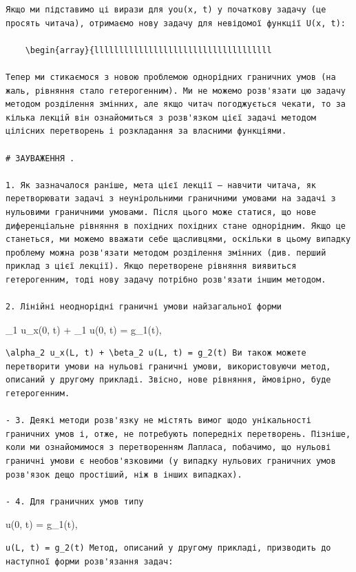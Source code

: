 \documentclass[
  ukrainian,
]{article}
\begin{document}
\begin{verbatim}
Якщо ми підставимо ці вирази для you(x, t) у початкову задачу (це просять читача), отримаємо нову задачу для невідомої функції U(x, t):

    \begin{array}{llllllllllllllllllllllllllllllllllll

Тепер ми стикаємося з новою проблемою однорідних граничних умов (на жаль, рівняння стало гетерогенним). Ми не можемо розв'язати цю задачу методом розділення змінних, але якщо читач погоджується чекати, то за кілька лекцій він ознайомиться з розв'язком цієї задачі методом цілісних перетворень і розкладання за власними функціями.

# ЗАУВАЖЕННЯ .

1. Як зазначалося раніше, мета цієї лекції — навчити читача, як перетворювати задачі з неунірольними граничними умовами на задачі з нульовими граничними умовами. Після цього може статися, що нове диференціальне рівняння в похідних похідних стане однорідним. Якщо це станеться, ми можемо вважати себе щасливцями, оскільки в цьому випадку проблему можна розв'язати методом розділення змінних (див. перший приклад з цієї лекції). Якщо перетворене рівняння виявиться гетерогенним, тоді нову задачу потрібно розв'язати іншим методом.

2. Лінійні неоднорідні граничні умови найзагальної форми
\end{verbatim}

\alpha\_1 u\_x(0, t) + \beta\_1 u(0, t) = g\_1(t),

\begin{verbatim}
\alpha_2 u_x(L, t) + \beta_2 u(L, t) = g_2(t) Ви також можете перетворити умови на нульові граничні умови, використовуючи метод, описаний у другому прикладі. Звісно, нове рівняння, ймовірно, буде гетерогенним.

- 3. Деякі методи розв'язку не містять вимог щодо унікальності граничних умов і, отже, не потребують попередніх перетворень. Пізніше, коли ми ознайомимося з перетворенням Лапласа, побачимо, що нульові граничні умови є необов'язковими (у випадку нульових граничних умов розв'язок дещо простіший, ніж в інших випадках).

- 4. Для граничних умов типу
\end{verbatim}

u(0, t) = g\_1(t),

\begin{verbatim}
u(L, t) = g_2(t) Метод, описаний у другому прикладі, призводить до наступної форми розв'язання задач:
\end{verbatim}
\end{document}
